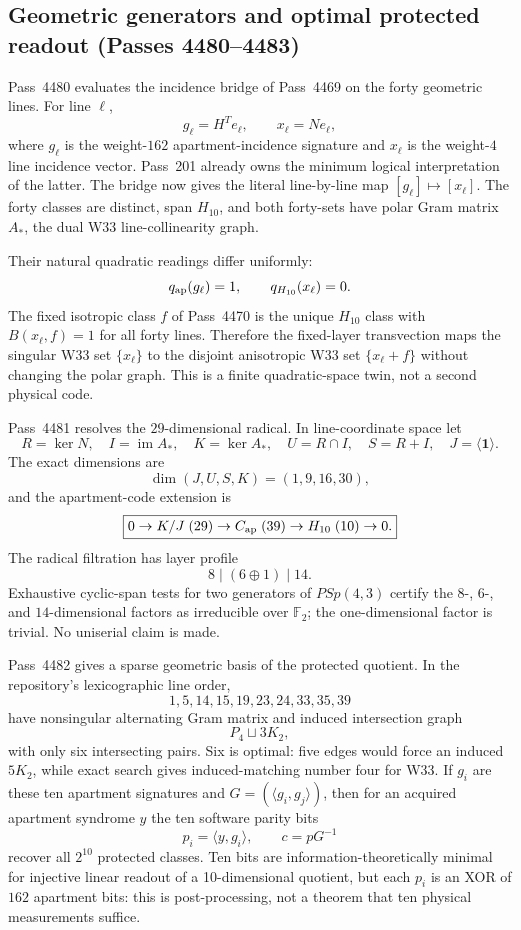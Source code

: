 \subsection{Geometric generators and optimal protected readout (Passes 4480--4483)}
\label{sec:pass4480-apartment-h10-continuation}

Pass~4480 evaluates the incidence bridge of Pass~4469 on the forty geometric
lines.  For line $\ell$,
\[
 g_\ell=H^Te_\ell,\qquad x_\ell=Ne_\ell,
\]
where $g_\ell$ is the weight-$162$ apartment-incidence signature and $x_\ell$
is the weight-$4$ line incidence vector.  Pass~201 already owns the minimum
logical interpretation of the latter.  The bridge now gives the literal
line-by-line map $[g_\ell]\mapsto[x_\ell]$.  The forty classes are distinct,
span $H_{10}$, and both forty-sets have polar Gram matrix $A_*$, the dual W33
line-collinearity graph.

Their natural quadratic readings differ uniformly:
\[
 q_{\rm ap}(g_\ell)=1,\qquad q_{H_{10}}(x_\ell)=0.
\]
The fixed isotropic class $f$ of Pass~4470 is the unique $H_{10}$ class with
$B(x_\ell,f)=1$ for all forty lines.  Therefore the fixed-layer transvection
maps the singular W33 set $\{x_\ell\}$ to the disjoint anisotropic W33 set
$\{x_\ell+f\}$ without changing the polar graph.  This is a finite
quadratic-space twin, not a second physical code.

Pass~4481 resolves the $29$-dimensional radical.  In line-coordinate space let
\[
 R=\ker N,\quad I=\operatorname{im}A_*,\quad K=\ker A_*,\quad
 U=R\cap I,\quad S=R+I,\quad J=\langle\mathbf1\rangle.
\]
The exact dimensions are
\[
 \dim(J,U,S,K)=(1,9,16,30),
\]
and the apartment-code extension is
\[
 \boxed{0\to K/J\;(29)\to C_{\rm ap}\;(39)\to H_{10}\;(10)\to0.}
\]
The radical filtration has layer profile
\[
 \boxed{8\mid(6\oplus1)\mid14.}
\]
Exhaustive cyclic-span tests for two generators of $PSp(4,3)$ certify the
$8$-, $6$-, and $14$-dimensional factors as irreducible over $\mathbb F_2$;
the one-dimensional factor is trivial.  No uniserial claim is made.

Pass~4482 gives a sparse geometric basis of the protected quotient.  In the
repository's lexicographic line order,
\[
 \boxed{1,5,14,15,19,23,24,33,35,39}
\]
have nonsingular alternating Gram matrix and induced intersection graph
\[
 \boxed{P_4\sqcup3K_2,}
\]
with only six intersecting pairs.  Six is optimal: five edges would force an
induced $5K_2$, while exact search gives induced-matching number four for W33.
If $g_i$ are these ten apartment signatures and $G=(\langle g_i,g_j\rangle)$,
then for an acquired apartment syndrome $y$ the ten software parity bits
\[
 p_i=\langle y,g_i\rangle,\qquad c=pG^{-1}
\]
recover all $2^{10}$ protected classes.  Ten bits are information-theoretically
minimal for injective linear readout of a 10-dimensional quotient, but each
$p_i$ is an XOR of $162$ apartment bits: this is post-processing, not a theorem
that ten physical measurements suffice.

